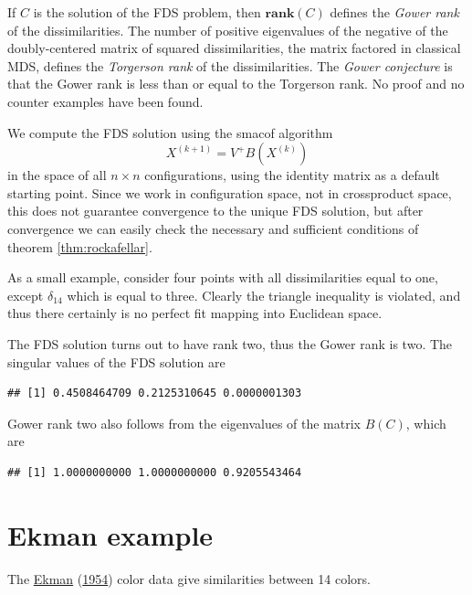 \documentclass[
  12pt,
]{book}
\theoremstyle{definition}
\theoremstyle{definition}
\theoremstyle{definition}
\theoremstyle{definition}
\theoremstyle{remark}
\begin{document}
If \(C\) is the solution of the FDS problem, then \(\mathbf{rank}(C)\) defines the \emph{Gower rank} of the dissimilarities. The number of positive eigenvalues of the negative of the doubly-centered matrix of squared dissimilarities, the matrix factored in classical MDS, defines the \emph{Torgerson rank} of the dissimilarities. The \emph{Gower conjecture} is that the
Gower rank is less than or equal to the Torgerson rank. No proof and no counter examples have been found.

We compute the FDS solution using the smacof algorithm
\begin{equation}
X^{(k+1)}=V^+B(X^{(k)})
\end{equation}
in the space of all \(n\times n\) configurations, using the identity matrix as a default starting point. Since we work in configuration space, not in crossproduct space, this does not guarantee convergence to the unique FDS solution, but after convergence we can easily check the necessary and sufficient conditions of theorem \ref{thm:rockafellar}.

As a small example, consider four points with all dissimilarities equal to one, except \(\delta_{14}\) which is equal to three. Clearly the triangle inequality is violated, and thus there certainly is no perfect fit mapping into Euclidean space.

The FDS solution turns out to have rank two, thus the Gower rank is two. The singular values of the
FDS solution are

\begin{verbatim}
## [1] 0.4508464709 0.2125310645 0.0000001303
\end{verbatim}

Gower rank two also follows from the eigenvalues of the matrix \(B(C)\), which are

\begin{verbatim}
## [1] 1.0000000000 1.0000000000 0.9205543464
\end{verbatim}

\hypertarget{ekman-example-1}{%
\section{Ekman example}\label{ekman-example-1}}

The \protect\hyperlink{ref-ekman_54}{Ekman} (\protect\hyperlink{ref-ekman_54}{1954}) color data give similarities between 14 colors.
\end{document}
